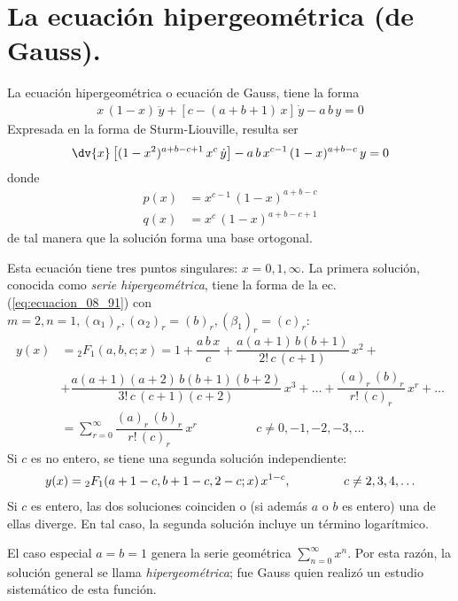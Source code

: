\section{La ecuación hipergeométrica (de Gauss).}
La ecuación hipergeométrica o ecuación de Gauss, tiene la forma
\begin{align*}
x \, (1 - x) \, \ddot{y} + [c - (a + b + 1) \, x] \, \dot{y} - a \, b \, y = 0
\end{align*}
Expresada en la forma de Sturm-Liouville, resulta ser
\begin{align*}
\dv{x} \left[ (1 - x^{2})^{a+b-c+1} \, x^{c} \, \dot{y} \right] - a \, b \, x^{c-1} \, (1 - x)^{a+b-c} \, y = 0
\end{align*}
donde
\begin{align*}
p (x) &= x^{c-1} \, (1 - x)^{a+b-c} \\
q (x) &= x^{c} \, (1 - x)^{a+b-c+1}
\end{align*}
de tal manera que la solución forma una base ortogonal.
\par
Esta ecuación tiene tres puntos singulares: $x = 0, 1, \infty$. La primera solución, conocida como \emph{serie hipergeométrica}, tiene la forma de la ec. (\ref{eq:ecuacion_08_91}) con $m=2, n=1, (\alpha_{1})_{r}, (\alpha_{2})_{r} = (b)_{r}, (\beta_{1})_{r} = (c)_{r}$:
\begin{align*}
y (x) &= {}_{2} F_{1} (a, b, c ; x) = 1 + \dfrac{a \, b \, x}{c} + \dfrac{a (a + 1) \, b (b + 1)}{2! \, c \, (c + 1)} \, x^{2} + \\
&+ \dfrac{a (a + 1)(a + 2) \, b (b + 1) (b + 2)}{3! \, c \, (c + 1)(c + 2)} \, x^{3} + \ldots + \dfrac{(a)_{r} \, (b)_{r}}{r! \, (c)_{r}} \, x^{r} + \ldots \\
&= \sum_{r=0}^{\infty} \dfrac{(a)_{r} \, (b)_{r}}{r! \, (c)_{r}} \, x^{r} \hspace{2cm} c \neq 0, -1, -2, -3, \ldots
\end{align*}
Si $c$ es no entero, se tiene una segunda solución independiente:
\begin{align*}
y(x) = {}_{2} F_{1} (a + 1 - c, b + 1 - c, 2 - c; x) \, x^{1-c}, \hspace{1.5cm} c \neq 2, 3, 4, \ldots
\end{align*}
Si $c$ es entero, las dos soluciones coinciden o (si además $a$ o $b$ es entero) una de ellas diverge. En tal caso, la segunda solución incluye un término logarítmico.
\par
El caso especial $a = b = 1$ genera la serie geométrica $\displaystyle{\sum_{n=0}^{\infty} x^{n}}$. Por esta razón, la solución general se llama \emph{hipergeométrica}; fue Gauss quien realizó un estudio sistemático de esta función.
